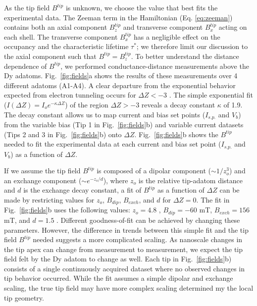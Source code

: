\documentclass[reprint,amsmath,amssymb,aps,nofootinbib,onecolumn]{revtex4-2}
\begin{document}
As the tip field $B^{tip}$ is unknown, we choose the value that best fits the experimental data. The Zeeman term in the Hamiltonian (Eq. \ref{eq:zeeman}) contains both an axial component $B^{tip}_z$ and transverse component $B^{tip}_x$ acting on each shell. The transverse component $B^{tip}_x$ has a negligible effect on the occupancy and the characteristic lifetime $\tau^{*}$; we therefore limit our discussion to the axial component such that $B^{tip} = B^{tip}_z$. 
To better understand the distance dependence of $B^{tip}$, we performed conductance-distance measurements above the Dy adatoms. Fig.~\ref{fig:fields}a shows the results of these measurements over 4 different adatoms (A1-A4). A clear departure from the exponential behavior expected from electron tunneling occurs for $\Delta Z < -3$ \text{\normalfont\AA}. The simple exponential fit ($I(\Delta Z) = I_o e^{-\kappa \Delta Z}$) of the region $\Delta Z > -3$ \text{\normalfont\AA} reveals a decay constant $\kappa$ of 1.9. The decay constant allows us to map current and bias set points ($I_{s.p.}$ and $V_{b}$) from the variable bias (Tip 1 in Fig.~\ref{fig:fields}b) and variable current datasets (Tips 2 and 3 in Fig.~\ref{fig:fields}b) onto $\Delta Z$. Fig.~\ref{fig:fields}b shows the $B^{tip}$ needed to fit the experimental data at each current and bias set point ($I_{s.p.}$ and  $V_{b}$) as a function of $\Delta Z$. \par
If we assume the tip field $B^{tip}$ is composed of a dipolar component ($\sim 1/z_o^{3}$) and an exchange component ($\sim e^{-z_o/d}$), where $z_o$ is the relative tip-adatom distance and $d$ is the exchange decay constant, a fit of $B^{tip}$ as a function of $\Delta Z$ can be made by restricting values for $z_o$, $B_{dip}$, $B_{exch}$, and $d$ for $\Delta Z = 0$. The fit in Fig.~\ref{fig:fields}b uses the following values: $z_o = 4.8$ \text{\normalfont\AA}, $B_{dip} = -60$ mT, $B_{exch} = 156$ mT, and $d = 1.5$ \text{\normalfont\AA}. Different goodness-of-fit can be achieved by changing these parameters. However, the difference in trends between this simple fit and the tip field $B^{tip}$ needed suggests a more complicated scaling. As nanoscale changes in the tip apex can change from measurement to measurement, we expect the tip field felt by the Dy adatom to change as well. Each tip in Fig.~\ref{fig:fields}b) consists of a single continuously acquired dataset where no observed changes in tip behavior occurred. While the fit assumes a simple dipolar and exchange scaling, the true tip field may have more complex scaling determined my the local tip geometry.
\end{document}
